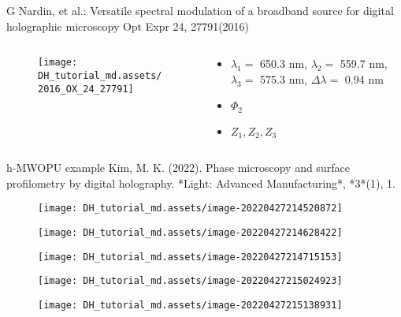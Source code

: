 \documentclass[t, aspectratio=169]{beamer}
\begin{document}
\begin{frame}{G Nardin, et al.: Versatile spectral modulation of a broadband source for digital holographic microscopy}
	\vspace{-3 mm}
	\small Opt Expr 24, 27791(2016)
	\begin{columns}
		\begin{column}{.6\textwidth}
			\vspace{-5 mm}
			\begin{figure}
				\texttt{[image: DH\_tutorial\_md.assets/2016\_OX\_24\_27791]}
			\end{figure}
		\end{column}
		\begin{column}{.4\textwidth}
			\begin{itemize}
				\item[a) ] $\lambda_1 = $ 650.3 nm, $ \lambda_2 = $ 559.7 nm, $ \lambda_3 = $ 575.3 nm, $ \Delta\lambda = $ 0.94 nm
				\item[b) ] $ \Phi_2 $
				\item[c) ] $ Z_1, Z_2, Z_3 $
			\end{itemize}
		\end{column}
	\end{columns}
\end{frame}


\begin{frame}[allowframebreaks]{h-MWOPU example}
Kim, M. K. (2022). Phase microscopy and surface profilometry by digital holography. *Light: Advanced Manufacturing*, *3*(1), 1.
	\begin{figure}
		\texttt{[image: DH\_tutorial\_md.assets/image-20220427214520872]}
	\end{figure}
	\begin{figure}
		\texttt{[image: DH\_tutorial\_md.assets/image-20220427214628422]}
	\end{figure}
	\begin{figure}
		\texttt{[image: DH\_tutorial\_md.assets/image-20220427214715153]}
	\end{figure}
	\begin{figure}
		\texttt{[image: DH\_tutorial\_md.assets/image-20220427215024923]}
	\end{figure}
	\begin{figure}
		\texttt{[image: DH\_tutorial\_md.assets/image-20220427215138931]}
	\end{figure}
\end{frame}
\end{document}

